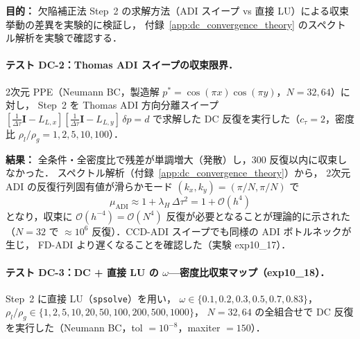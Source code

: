 \noindent\textbf{目的：}
欠陥補正法 Step~2 の求解方法（ADI スイープ vs 直接 LU）による収束挙動の差異を実験的に検証し，
付録~\ref{app:dc_convergence_theory} のスペクトル解析を実験で確認する．

\paragraph{テスト DC-2：Thomas ADI スイープの収束限界．}

2次元 PPE（Neumann BC，製造解 $p^* = \cos(\pi x)\cos(\pi y)$，$N=32,64$）に対し，
Step~2 を Thomas ADI 方向分離スイープ
$[\frac{1}{\Delta\tau}\mathbf{I} - L_{L,x}][\frac{1}{\Delta\tau}\mathbf{I} - L_{L,y}]\,\delta p = d$
で求解した DC 反復を実行した（$c_\tau = 2$，密度比 $\rho_l/\rho_g = 1, 2, 5, 10, 100$）．

\noindent\textbf{結果：} 全条件・全密度比で残差が単調増大（発散）し，300 反復以内に収束しなかった．
スペクトル解析（付録~\ref{app:dc_convergence_theory}）から，
2次元 ADI の反復行列固有値が滑らかモード $(k_x, k_y) = (\pi/N, \pi/N)$ で
\begin{equation}
  \mu_{\mathrm{ADI}} \approx 1 + \lambda_H\,\Delta\tau^2 = 1 + \mathcal{O}(h^4)
\end{equation}
となり，収束に $\mathcal{O}(h^{-4}) = \mathcal{O}(N^4)$ 反復が必要となることが理論的に示された
（$N=32$ で $\approx 10^6$ 反復）．CCD-ADI スイープでも同様の ADI ボトルネックが生じ，
FD-ADI より遅くなることを確認した（実験 exp10\_17）．

\paragraph{テスト DC-3：DC + 直接 LU の $\omega$—密度比収束マップ（exp10\_18）．}

Step~2 に直接 LU（\texttt{spsolve}）を用い，
$\omega \in \{0.1, 0.2, 0.3, 0.5, 0.7, 0.83\}$，
$\rho_l/\rho_g \in \{1, 2, 5, 10, 20, 50, 100, 200, 500, 1000\}$，
$N = 32, 64$ の全組合せで DC 反復を実行した（Neumann BC，tol $= 10^{-8}$，maxiter $= 150$）．

